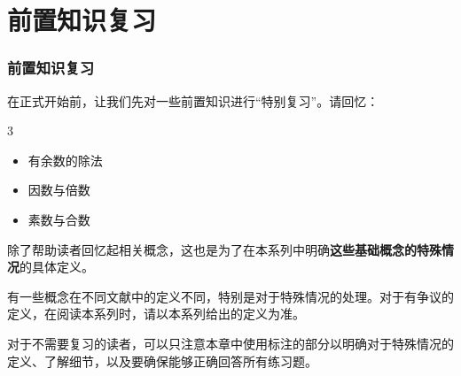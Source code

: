 
\section{前置知识复习}
\begin{frame}
  \frametitle{前置知识复习}
  在正式开始前，让我们先对一些前置知识进行“特别复习”。请回忆：
  \begin{mymulticols}[l][l]{3}
    \begin{itemize}
      \item 有余数的除法
      \item 因数与倍数
      \item 素数与合数
    \end{itemize}
  \end{mymulticols}
  \pause
  
  \emptyline
  除了帮助读者回忆起相关概念，这也是为了在本系列中明确\textbf{这些基础概念的特殊情况}的具体定义。
  
  有一些概念在不同文献中的定义不同，特别是对于特殊情况的处理。对于有争议的定义，在阅读本系列时，请以本系列给出的定义为准。
  \pause
  
  \emptyline
  对于不需要复习的读者，可以只注意本章中使用标注的部分以明确对于特殊情况的定义、了解细节，以及要确保能够正确回答所有\alert{练习题}。
\end{frame}

